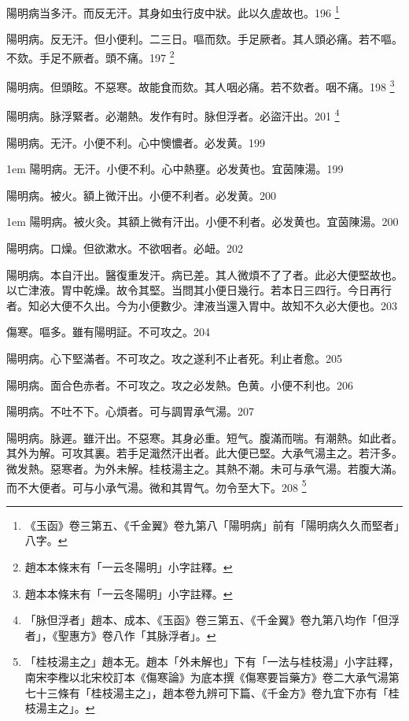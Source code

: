 陽明病当多汗。而反无汗。其身如虫行皮中狀。此以久虗故也。196
	\footnote{
	《玉函》卷三第五、《千金翼》卷九第八「陽明病」前有「陽明病久久而堅者」八字。
	}

陽明病。反无汗。但小便利。二三日。嘔而欬。手足厥者。其人頭必痛。若不嘔。不欬。手足不厥者。頭不痛。197
	\footnote{
		趙本本條末有「一云冬陽明」小字註釋。
	}

陽明病。但頭眩。不惡寒。故能食而欬。其人咽必痛。若不欬者。咽不痛。198
	\footnote{
		趙本本條末有「一云冬陽明」小字註釋。
	}

陽明病。脉浮緊者。必潮熱。发作有时。{\khaai 脉}但浮者。必盜汗出。201
	\footnote{
		「脉但浮者」趙本、成本、《玉函》卷三第五、《千金翼》卷九第八均作「但浮者」，《聖惠方》卷八作「其脉浮者」。
	}

陽明病。无汗。小便不利。心中懊憹者。必发黄。199

\hangindent 1em
陽明病。无汗。小便不利。心中熱壅。必发黄也。宜茵陳湯。{\shenghui}199

陽明病。被火。額上微汗出。小便不利者。必发黄。200

\hangindent 1em
陽明病。被火灸。其額上微有汗出。小便不利者。必发黄也。宜茵陳湯。{\shenghui}200

陽明病。口燥。但欲漱水。不欲咽者。必衄。202

陽明病。本自汗出。醫復重发汗。病已差。其人微煩不了了者。此必大便堅故也。以亡津液。胃中{\khaai 乾}燥。故令其堅。当問其小便日幾行。若本日三四行。今日再行者。知必大便不久出。今为小便數少。津液当還入胃中。故知不久必大便也。203

傷寒。嘔多。雖有陽明証。不可攻之。204

陽明病。心下堅滿者。不可攻之。攻之遂利不止者死。利止者愈。205

陽明病。面合色赤者。不可攻之。{\khaai 攻之}必发熱。色黄。小便不利也。206

陽明病。不吐不下。心煩者。可与{\khaai 調胃}承气湯。207

陽明病。脉遲。雖汗出。不惡寒。其身必重。短气。腹滿而喘。有潮熱。如此者。其外为解。可攻其裏。若手足濈然汗出者。此大便已堅。{\khaai 大}承气湯主之。若汗多。微发熱。惡寒者。为外未解。{\khaai 桂枝湯主之。}其熱不潮。未可与承气湯。若腹大滿。而不大便者。可与小承气湯。微和其胃气。勿令至大下。208
	\footnote{
		「桂枝湯主之」趙本无。趙本「外未解也」下有「一法与桂枝湯」小字註釋，南宋李檉以北宋校訂本《傷寒論》为底本撰《傷寒要旨藥方》卷二大承气湯第七十三條有「桂枝湯主之」，趙本卷九辨可下篇、《千金方》卷九宜下亦有「桂枝湯主之」。
	}

